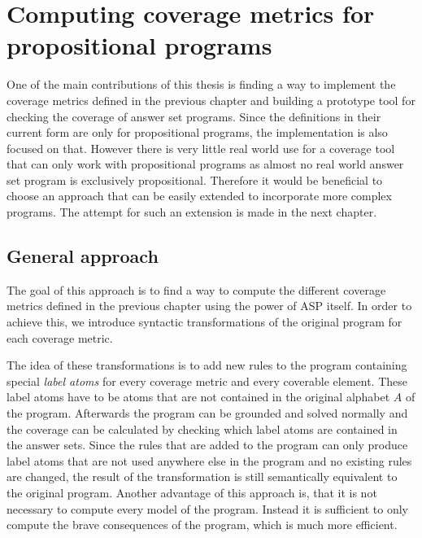 \chapter{Computing coverage metrics for propositional programs}
\label{ch:Computing coverage metrics for propositional programs}
One of the main contributions of this thesis is finding a way to implement the coverage metrics defined in the previous chapter and building a prototype tool for checking the coverage of answer set programs. Since the definitions in their current form are only for propositional programs, the implementation is also focused on that. However there is very little real world use for a coverage tool that can only work with propositional programs as almost no real world answer set program is exclusively propositional. Therefore it would be beneficial to choose an approach that can be easily extended to incorporate more complex programs. The attempt for such an extension is made in the next chapter.

\begin{comment}
    - one of the main contributions of this thesis is finding a way to build a prototype tool for checking coverage of ASP programs based on the theoretic definitions of coverage described in the previous chapter.   \/
    
    - as the definitions are only applicable to propositional programs, those will be my focus for now. However such a tool would not be very practical so ideally an approach should be chosen that can easily be extended.    \/
    
    (maybe include a short history of what i tried but didnt work? -> meta programming with reify output)
\end{comment}

\section{General approach}
\label{sec:Computing coverage metrics for propositional programs/General approach}
The goal of this approach is to find a way to compute the different coverage metrics defined in the previous chapter using the power of ASP itself. In order to achieve this, we introduce syntactic transformations of the original program for each coverage metric. 

The idea of these transformations is to add new rules to the program containing special \emph{label atoms} for every coverage metric and every coverable element. These label atoms have to be atoms that are not contained in the original alphabet $A$ of the program. Afterwards the program can be grounded and solved normally and the coverage can be calculated by checking which label atoms are contained in the answer sets. Since the rules that are added to the program can only produce label atoms that are not used anywhere else in the program and no existing rules are changed, the result of the transformation is still semantically equivalent to the original program. Another advantage of this approach is, that it is not necessary to compute every model of the program. Instead it is sufficient to only compute the brave consequences of the program, which is much more efficient.

